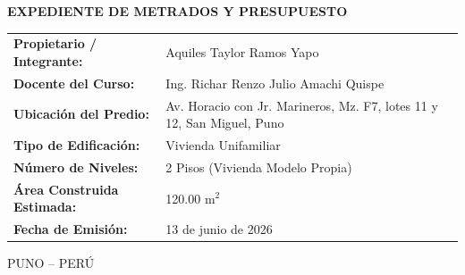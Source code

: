 \begin{titlepage}
\begin{minipage}{5.20in}
\vspace{0.40in}
{\fontsize{13}{16}\selectfont\bfseries EXPEDIENTE DE METRADOS Y PRESUPUESTO\par}

\vspace{0.40in}
\begin{flushleft}
\fontsize{10}{13}\selectfont
\renewcommand{\arraystretch}{1.2}
\begin{tabular}{>{\bfseries}p{1.8in}p{3.05in}}
Propietario / Integrante: & Aquiles Taylor Ramos Yapo \\
Docente del Curso: & Ing. Richar Renzo Julio Amachi Quispe \\
Ubicación del Predio: & Av. Horacio con Jr. Marineros, Mz. F7, lotes 11 y 12, San Miguel, Puno \\
Tipo de Edificación: & Vivienda Unifamiliar \\
Número de Niveles: & 2 Pisos (Vivienda Modelo Propia) \\
Área Construida Estimada: & 120.00 m\(^2\) \\
Fecha de Emisión: & 13 de junio de 2026 \\
\end{tabular}
\end{flushleft}

\vfill
{\fontsize{10}{12}\selectfont PUNO -- PERÚ\par}
{\fontsize{9}{11}\par}
\end{minipage}

\end{titlepage}
